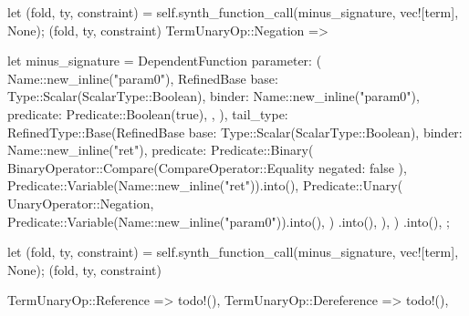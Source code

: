 \documentclass[
  oneside,
  english,
  coorientadorbanca,
  noabntexcite
]{ufsc-thesis-rn46-2019}
\begin{document}
\begin{rustcode}
{{{{                let (fold, ty, constraint) =
                    self.synth_function_call(minus_signature, vec![term], None);
                (fold, ty, constraint)
            }
            TermUnaryOp::Negation => {
                let minus_signature = DependentFunction {
                    parameter: (
                        Name::new_inline("param0"),
                        RefinedBase {
                            base: Type::Scalar(ScalarType::Boolean),
                            binder: Name::new_inline("param0"),
                            predicate: Predicate::Boolean(true),
                        },
                    ),
                    tail_type: RefinedType::Base(RefinedBase {
                        base: Type::Scalar(ScalarType::Boolean),
                        binder: Name::new_inline("ret"),
                        predicate: Predicate::Binary(
                            BinaryOperator::Compare(CompareOperator::Equality { negated: false }),
                            Predicate::Variable(Name::new_inline("ret")).into(),
                            Predicate::Unary(
                                UnaryOperator::Negation,
                                Predicate::Variable(Name::new_inline("param0")).into(),
                            )
                            .into(),
                        ),
                    })
                    .into(),
                };

                let (fold, ty, constraint) =
                    self.synth_function_call(minus_signature, vec![term], None);
                (fold, ty, constraint)
            }
            TermUnaryOp::Reference => todo!(),
            TermUnaryOp::Dereference => todo!(),
        }
    }

}
\end{rustcode}
\end{document}
